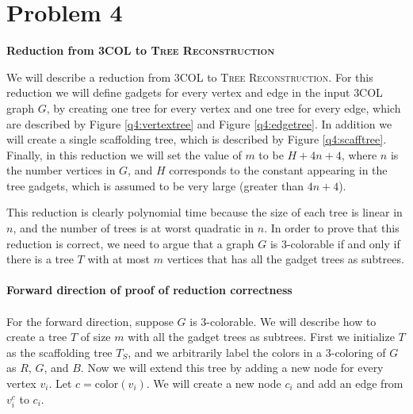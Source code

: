 \newcommand{\tr}{\textsc{Tree Reconstruction}\xspace}
\newcommand{\tc}{\textsc{3COL}\xspace}

\section*{Problem 4}

{\bf Reduction from \tc to \tr}

We will describe a reduction from \tc to \tr. For this reduction we
will define gadgets for every vertex and edge in the input \tc graph
$G$, by creating one tree for every vertex and one tree for every
edge, which are described by Figure \ref{q4:vertextree}
and Figure \ref{q4:edgetree}.
In addition we will create a single scaffolding tree, which is
described by Figure \ref{q4:scafftree}. Finally, in this
reduction we will set the value of $m$ to be $H + 4n + 4$,
where $n$ is the number vertices in $G$, and $H$ corresponds
to the constant appearing in the tree gadgets, which is assumed
to be very large (greater than $4n + 4$).

This reduction is clearly polynomial time because the size of
each tree is linear in $n$, and the number of trees is at worst
quadratic in $n$. In order to prove that this reduction is correct,
we need to argue that a graph $G$ is 3-colorable if and only if there
is a tree $T$ with at most $m$ vertices that has all the gadget trees
as subtrees.\\ 
\\
{\bf Forward direction of proof of reduction correctness}\\
\\
For the forward direction, suppose $G$ is 3-colorable. We will
describe how to create a tree $T$ of size $m$ with all the gadget
trees as subtrees. First we initialize $T$ as the scaffolding
tree $T_S$, and we arbitrarily label the colors in a 3-coloring
of $G$ as $R$, $G$, and $B$. Now we will extend this tree
by adding a new node for every vertex $v_i$. Let $c = \text{color}(v_i)$.
We will create a new node $c_i$ and
add an edge from $v_i^c$ to $c_i$.

